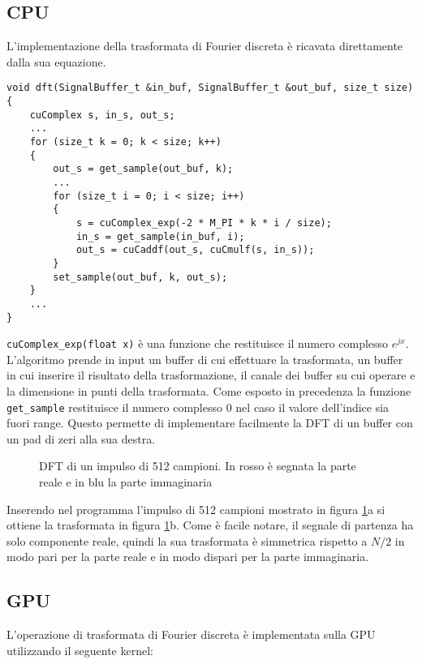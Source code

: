 \subsection{CPU}
L'implementazione della trasformata di Fourier discreta è ricavata direttamente dalla sua equazione.

\begin{lstlisting}
void dft(SignalBuffer_t &in_buf, SignalBuffer_t &out_buf, size_t size)
{
    cuComplex s, in_s, out_s;
    ...
    for (size_t k = 0; k < size; k++)
    {
        out_s = get_sample(out_buf, k);
        ...
        for (size_t i = 0; i < size; i++)
        {
            s = cuComplex_exp(-2 * M_PI * k * i / size);
            in_s = get_sample(in_buf, i);
            out_s = cuCaddf(out_s, cuCmulf(s, in_s));
        }
        set_sample(out_buf, k, out_s);
    }
    ...
}
\end{lstlisting}

\lstinline{cuComplex_exp(float x)} è una funzione che restituisce il numero complesso $e^{jx}$. L'algoritmo prende in input un buffer di cui effettuare la trasformata, un buffer in cui inserire il risultato della trasformazione, il canale dei buffer su cui operare e la dimensione in punti della trasformata. Come esposto in precedenza la funzione \lstinline{get_sample} restituisce il numero complesso $0$ nel caso il valore dell'indice sia fuori range. Questo permette di implementare facilmente la DFT di un buffer con un pad di zeri alla sua destra.

\begin{figure}[h]
    \centering
    \caption{DFT di un impulso di 512 campioni. In rosso è segnata la parte reale e in blu la parte immaginaria}
    \label{fig:pulse512}
\end{figure}

Inserendo nel programma l'impulso di 512 campioni mostrato in figura \ref{fig:pulse512}a si ottiene la trasformata in figura \ref{fig:pulse512}b. Come è facile notare, il segnale di partenza ha solo componente reale, quindi la sua trasformata è simmetrica rispetto a $N/2$ in modo pari per la parte reale e in modo dispari per la parte immaginaria.

\subsection{GPU}
L'operazione di trasformata di Fourier discreta è implementata sulla GPU utilizzando il seguente kernel:

